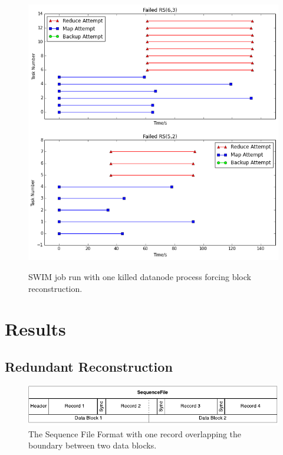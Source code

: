 \documentclass{ucetd}
\begin{document}
\begin{figure}
    {\includegraphics[width=\textwidth]{plots/recompute.png}}
    \caption[Block Reconstruction Tests]{SWIM job run with one killed datanode
    process forcing block reconstruction.}
    \label{recompute}
\end{figure}




\section{Results}

\subsection{Redundant Reconstruction}

\begin{figure}
    \centering
    \includegraphics[width=\textwidth]{diagrams/SequenceFile.pdf}
    \caption[Sequence File Format]{The Sequence File Format with one record
        overlapping the boundary between two data blocks.}
    \label{seqFile}
\end{figure}
\end{document}

